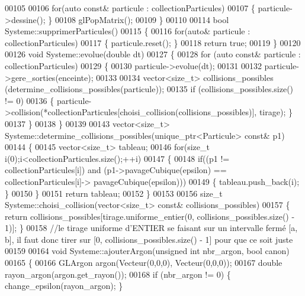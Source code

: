 \begin{DoxyCode}
00105     
00106     \textcolor{keywordflow}{for}(\textcolor{keyword}{auto} \textcolor{keyword}{const}& particule : collectionParticules) 
00107     \{ particule->dessine(); \}
00108     glPopMatrix();
00109 \}
00110 
00114 \textcolor{keywordtype}{bool} Systeme::supprimerParticules()
00115 \{
00116     \textcolor{keywordflow}{for}(\textcolor{keyword}{auto}& particule : collectionParticules)
00117     \{ particule.reset(); \}
00118     \textcolor{keywordflow}{return} \textcolor{keyword}{true};
00119 \}
00120 
00126 \textcolor{keywordtype}{void} Systeme::evolue(\textcolor{keywordtype}{double} dt)
00127 \{
00128     \textcolor{keywordflow}{for} (\textcolor{keyword}{auto} \textcolor{keyword}{const}& particule : collectionParticules) 
00129     \{
00130         particule->evolue(dt);
00131         
00132         particule->gere_sorties(enceinte);
00133         
00134         vector<size\_t> collisions\_possibles (determine\_collisions\_possibles(particule));
00135         \textcolor{keywordflow}{if} (collisions\_possibles.size() != 0)
00136         \{ particule->collision(*collectionParticules[choisi\_collision(collisions\_possibles)], tirage); \}
00137     \}
00138 \}
00139 
00143 vector<size\_t> Systeme::determine\_collisions\_possibles(unique\_ptr<Particule> \textcolor{keyword}{const}& p1)
00144 \{
00145     vector<size\_t> tableau;
00146     \textcolor{keywordflow}{for}(\textcolor{keywordtype}{size\_t} i(0);i<collectionParticules.size();++i)
00147     \{
00148         \textcolor{keywordflow}{if}((p1 != collectionParticules[i]) and (p1->pavageCubique(epsilon) == collectionParticules[i]->
      pavageCubique(epsilon)))
00149         \{ tableau.push\_back(i); \}
00150     \}
00151     \textcolor{keywordflow}{return} tableau;
00152 \}
00153 
00156 \textcolor{keywordtype}{size\_t} Systeme::choisi\_collision(vector<size\_t> \textcolor{keyword}{const}& collisions\_possibles)
00157 \{ \textcolor{keywordflow}{return} collisions\_possibles[tirage.uniforme_entier(0, collisions\_possibles.size() - 1)]; \}
00158   \textcolor{comment}{//le tirage uniforme d'ENTIER se faisant sur un intervalle fermé [a, b], il faut donc tirer sur [0,
       collisions\_possibles.size() - 1] pour que ce soit juste}
00159 
00164 \textcolor{keywordtype}{void} Systeme::ajouterArgon(\textcolor{keywordtype}{unsigned} \textcolor{keywordtype}{int} nbr\_argon, \textcolor{keywordtype}{bool} canon)
00165 \{
00166     GLArgon argon(Vecteur(0,0,0), Vecteur(0,0,0));
00167     \textcolor{keywordtype}{double} rayon\_argon(argon.get_rayon());
00168     \textcolor{keywordflow}{if} (nbr\_argon != 0) \{ change\_epsilon(rayon\_argon); \}

\end{DoxyCode}
